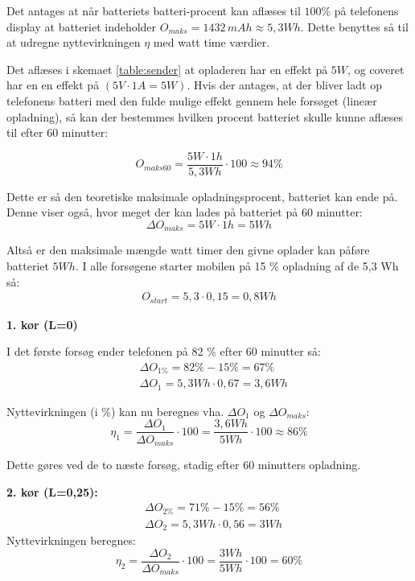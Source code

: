 Det antages at når batteriets batteri-procent kan aflæses til $100 \%$ på telefonens display at batteriet indeholder $O_{maks}=1432\, mAh \approx 5,3 Wh$. Dette benyttes så til at udregne nyttevirkningen $\eta$ med watt time værdier.

Det aflæses i skemaet \ref{table:sender} at opladeren har en effekt på $5 W$, og coveret har en en effekt på $(5 V \cdot 1 A = 5 W)$. Hvis der antages, at der bliver ladt op telefonens batteri med den fulde mulige effekt gennem hele forsøget (lineær opladning), så kan der bestemmes hvilken procent batteriet skulle kunne aflæses til efter 60 minutter:

\begin{equation}
O_{maks60}= \frac{5 W\cdot 1h}{5,3Wh} \cdot 100 \approx 94 \%
\label{eq:omaks}
\end{equation}

Dette er så den teoretiske maksimale opladningsprocent, batteriet kan ende på. Denne viser også, hvor meget der kan lades på batteriet på 60 minutter:
\begin{equation}
\Delta O_{maks} = 5 W \cdot 1 h = 5Wh
\end{equation}

Altså er den maksimale mængde watt timer den givne oplader kan påføre batteriet $5 Wh$. I alle forsøgene starter mobilen på 15 \% opladning af de 5,3 Wh så:
\begin{align*}
O_{start} = 5,3 \cdot 0,15 = 0,8 Wh
\end{align*}
 

\textbf{1. kør (L=0)}

I det første forsøg ender telefonen på 82 \% efter 60 minutter så:
\begin{align*}
& \Delta O_{1\%} = 82\%-15\% =  67\%  \\
& \Delta O_1 = 5,3 Wh \cdot 0,67 = 3,6 Wh
\end{align*}


Nyttevirkningen (i \%) kan nu beregnes vha. $\Delta O_1$ og $\Delta O_{maks}$:  
\begin{equation}
\eta_1 = \frac{\Delta O_1}{\Delta O_{maks}} \cdot 100 = \frac{3,6 Wh}{5 Wh} \cdot 100 \approx 86 \%
\label{eq:nyt1}
\end{equation}

Dette gøres ved de to næste forsøg, stadig efter 60 minutters opladning.

\textbf{2. kør (L=0,25):}
\begin{align*}
& \Delta O_{2\%} = 71\%-15\% =  56\%  \\
& \Delta O_2 = 5,3 Wh \cdot 0,56 = 3 Wh
\end{align*}
Nyttevirkningen beregnes:
\begin{equation}
\eta_2 = \frac{\Delta O_2}{\Delta O_{maks}} \cdot 100 = \frac{3 Wh}{5 Wh} \cdot 100 = 60 \%
\label{eq:nyt2}
\end{equation}

